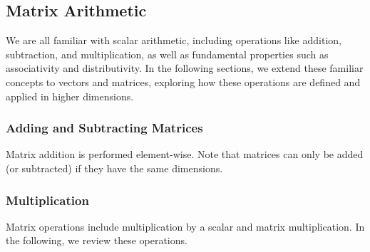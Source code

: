 \documentclass[../../cs111_main.tex]{subfiles}
\begin{document}


\subsection{Matrix Arithmetic}

We are all familiar with scalar arithmetic, including operations like addition, subtraction, and multiplication, as well as fundamental properties such as associativity and distributivity. In the following sections, we extend these familiar concepts to vectors and matrices, exploring how these operations are defined and applied in higher dimensions.

\subsubsection{Adding and Subtracting Matrices}

Matrix addition is performed element-wise. Note that matrices can only be added (or subtracted) if they have the same dimensions.




\subsubsection{Multiplication}

Matrix operations include multiplication by a scalar and matrix multiplication. In the following, we review these operations.


\end{document}
